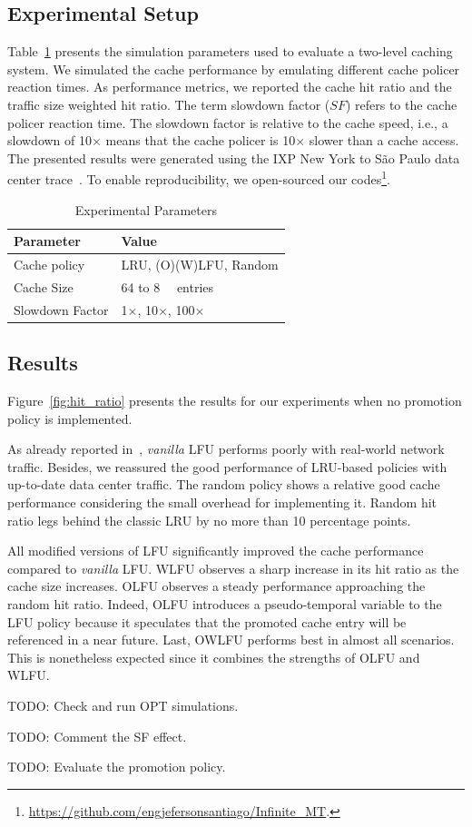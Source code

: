 \subsection{Experimental Setup}
Table~\ref{tab:setup} presents the simulation parameters used to evaluate a two-level caching system.
We simulated the cache performance by emulating different cache policer reaction times.
As performance metrics, we reported the cache hit ratio and the traffic size weighted hit ratio.
The term slowdown factor ($SF$) refers to the cache policer reaction time.
The slowdown factor is relative to the cache speed, i.e., a slowdown of 10$\times$ means that the cache policer is 10$\times$ slower than a cache access.
The presented results were generated using the IXP New York to S\~ao Paulo data center trace~\cite{caida:19}.
To enable reproducibility, we open-sourced our codes\footnote{\url{https://github.com/engjefersonsantiago/Infinite_MT}.}.


\begin{table}[h]
	\centering
	\caption{Experimental Parameters}
	\label{tab:setup}
	\begin{tabular}{|l|l|}
		\hline
		\textbf{Parameter}       & \textbf{Value}   \\
		\hline
		Cache policy            & LRU, (O)(W)LFU, Random			    \\
		Cache Size              & 64 to \SI{8}{\kilo\nothing} entries  \\
		Slowdown Factor         & 1$\times$, 10$\times$, 100$\times$        \\
		\hline
	\end{tabular}
\end{table}

\subsection{Results}
Figure~\ref{fig:hit_ratio} presents the results for our experiments when no promotion policy is implemented.

As already reported in~\cite{Kim:09}, \textit{vanilla} LFU performs poorly with real-world network traffic. Besides, we reassured the good performance of LRU-based policies with up-to-date data center traffic. The random policy shows a relative good cache performance considering the small overhead for implementing it. Random hit ratio legs behind the classic LRU by no more than 10 percentage points.

All modified versions of LFU significantly improved the cache performance compared to \textit{vanilla} LFU.
WLFU observes a sharp increase in its hit ratio as the cache size increases.
OLFU observes a steady performance approaching the random hit ratio.
Indeed, OLFU introduces a pseudo-temporal variable to the LFU policy because it speculates that the promoted cache entry will be referenced in a near future. 
Last, OWLFU performs best in almost all scenarios.
This is nonetheless expected since it combines the strengths of OLFU and WLFU.

TODO: Check and run OPT simulations.

TODO: Comment the SF effect.

TODO: Evaluate the promotion policy.